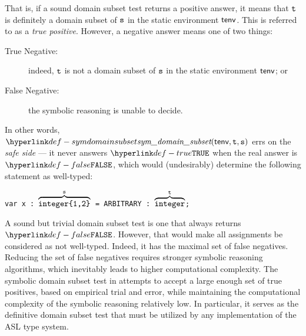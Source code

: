 That is, if a sound domain subset test returns a positive answer, it means that
$\texttt{t}$ is definitely a domain subset of $\texttt{s}$ in the static environment $\textsf{tenv}$.
This is referred to as a \emph{true positive}.
However, a negative answer means one of two things:
\begin{description}
  \item[True Negative:] indeed, $\texttt{t}$ is not a domain subset of $\texttt{s}$ in the static environment $\textsf{tenv}$; or
  \item[False Negative:] the symbolic reasoning is unable to decide.
\end{description}

In other words, $\symdomainsubset(\tenv, \vt, \vs)$ errs on the \emph{safe side} ---
it never answers $\True$ when the real answer is $\False$, which would (undesirably)
determine the following statement as well-typed:
\begin{center}
\texttt{var x : $\overbrace{\texttt{integer\{1,2\}}}^{\texttt{s}}$ = ARBITRARY : $\overbrace{\texttt{integer}}^{\texttt{t}}$;}
\end{center}

A sound but trivial domain subset test is one that always returns $\False$.
However, that would make all assignments be considered as not well-typed.
Indeed, it has the maximal set of false negatives.
Reducing the set of false negatives requires stronger symbolic reasoning algorithms,
which inevitably leads to higher computational complexity.
%
The symbolic domain subset test in 
attempts to accept a large enough set of true positives, based on empirical trial and error,
while maintaining the computational complexity of the symbolic reasoning relatively low.
%
In particular, it serves as the definitive domain subset test that must be utilized
by any implementation of the ASL type system.
